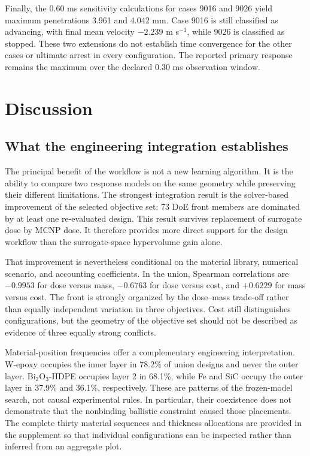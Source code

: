 Finally, the 0.60 ms sensitivity calculations for cases 9016 and 9026 yield maximum penetrations 3.961 and 4.042 mm. Case 9016 is still classified as advancing, with final mean velocity $-2.239$ m s$^{-1}$, while 9026 is classified as stopped. These two extensions do not establish time convergence for the other cases or ultimate arrest in every configuration. The reported primary response remains the maximum over the declared 0.30 ms observation window.

\section{Discussion}
\subsection{What the engineering integration establishes}
The principal benefit of the workflow is not a new learning algorithm. It is the ability to compare two response models on the same geometry while preserving their different limitations. The strongest integration result is the solver-based improvement of the selected objective set: 73 DoE front members are dominated by at least one re-evaluated design. This result survives replacement of surrogate dose by MCNP dose. It therefore provides more direct support for the design workflow than the surrogate-space hypervolume gain alone.

That improvement is nevertheless conditional on the material library, numerical scenario, and accounting coefficients. In the union, Spearman correlations are $-0.9953$ for dose versus mass, $-0.6763$ for dose versus cost, and $+0.6229$ for mass versus cost. The front is strongly organized by the dose--mass trade-off rather than equally independent variation in three objectives. Cost still distinguishes configurations, but the geometry of the objective set should not be described as evidence of three equally strong conflicts.

Material-position frequencies offer a complementary engineering interpretation. W-epoxy occupies the inner layer in 78.2\% of union designs and never the outer layer. Bi$_2$O$_3$-HDPE occupies layer 2 in 68.1\%, while Fe and SiC occupy the outer layer in 37.9\% and 36.1\%, respectively. These are patterns of the frozen-model search, not causal experimental rules. In particular, their coexistence does not demonstrate that the nonbinding ballistic constraint caused those placements. The complete thirty material sequences and thickness allocations are provided in the supplement so that individual configurations can be inspected rather than inferred from an aggregate plot.

